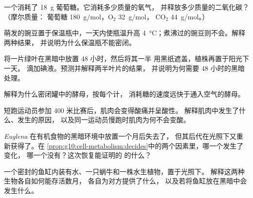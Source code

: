 \begin{exercise}[$\star\star$]\label{exo:g10:cell-metabolism:8}
一个消耗了 \qty{18}{g} 葡萄糖。它消耗多少质量的氧气，
并释放多少质量的二氧化碳？（摩尔质量：
葡萄糖 \qty{180}{g/mol}，$\mathrm{O_2}$ \qty{32}{g/mol}，
$\mathrm{CO_2}$ \qty{44}{g/mol}。）
\end{exercise}

\begin{exercise}[$\star\star$]\label{exo:g10:cell-metabolism:9}
萌发的豌豆置于保温瓶中，一天内使瓶温升高
\qty{4}{\celsius}；煮沸过的豌豆则不会。解释两种结果，
并说明为什么保温瓶不能密闭。
\end{exercise}

\begin{exercise}[$\star\star$]\label{exo:g10:cell-metabolism:10}
将一片绿叶在黑暗中放置 48 小时，然后将其一半
用黑纸遮盖，植株再置于阳光下一天。
滴加碘液。预测并解释两半叶片的结果，
并说明为何需要 48 小时的黑暗处理。
\end{exercise}

\begin{exercise}[$\star\star$]\label{exo:g10:cell-metabolism:11}
解释为什么密闭罐中的酵母，按每个计，
消耗糖的速度远快于通入空气的酵母。
\end{exercise}

\begin{exercise}[$\star\star\star$]\label{exo:g10:cell-metabolism:12}
短跑运动员参加 400 米比赛后，肌肉会变得酸痛并呈酸性。
解释肌肉中发生了什么、发生的原因，
以及同一运动员慢跑时肌肉为何不会变酸。
\end{exercise}

\begin{exercise}[$\star\star\star$]\label{exo:g10:cell-metabolism:13}
\emph{Euglena} 在有机食物的黑暗环境中放置一个月后失去了，
但其后代在光照下又重新获得了。在
\cref{prop:g10:cell-metabolism:decides}中的两个因素里，哪一个发生了变化，
哪一个没有？这次恢复能证明的
的什么？
\end{exercise}

\begin{exercise}[$\star\star\star$]\label{exo:g10:cell-metabolism:14}
一个密封的鱼缸内装有水、一只蜗牛和一株水生植物，置于光照下。
解释这两种生物各自如何能存活数月，
各自为对方提供了什么，
以及若将鱼缸放在黑暗中会发生什么。
\end{exercise}


